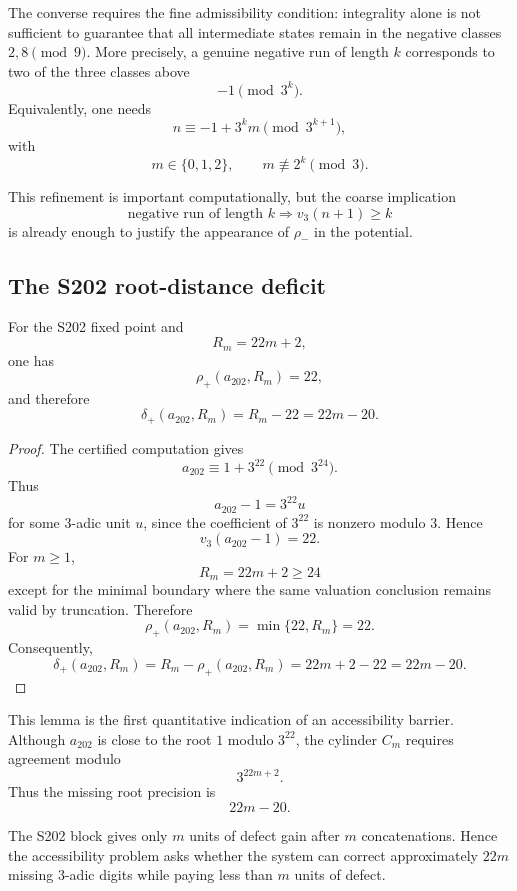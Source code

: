 The converse requires the fine admissibility condition: integrality alone
is not sufficient to guarantee that all intermediate states remain in the
negative classes \(2,8\pmod9\). More precisely, a genuine negative run of
length \(k\) corresponds to two of the three classes above
\[
-1\pmod{3^k}.
\]
Equivalently, one needs
\[
n\equiv -1+3^k m\pmod{3^{k+1}},
\]
with
\[
m\in\{0,1,2\},
\qquad
m\not\equiv 2^k\pmod3.
\]

This refinement is important computationally, but the coarse implication
\[
\text{negative run of length }k
\Longrightarrow
v_3(n+1)\ge k
\]
is already enough to justify the appearance of \(\rho_-\) in the potential.

\subsection{The S202 root-distance deficit}
\label{subsec:S202-root-distance-deficit}

\begin{lemma}
\label{lem:S202-root-deficit}
For the S202 fixed point and
\[
R_m=22m+2,
\]
one has
\[
\rho_+(a_{202},R_m)=22,
\]
and therefore
\[
\delta_+(a_{202},R_m)
=
R_m-22
=
22m-20.
\]
\end{lemma}

\begin{proof}
The certified computation gives
\[
a_{202}\equiv1+3^{22}\pmod{3^{24}}.
\]
Thus
\[
a_{202}-1
=
3^{22}u
\]
for some \(3\)-adic unit \(u\), since the coefficient of \(3^{22}\) is
nonzero modulo \(3\). Hence
\[
v_3(a_{202}-1)=22.
\]
For \(m\ge1\),
\[
R_m=22m+2\ge24
\]
except for the minimal boundary where the same valuation conclusion remains
valid by truncation. Therefore
\[
\rho_+(a_{202},R_m)
=
\min\{22,R_m\}
=
22.
\]
Consequently,
\[
\delta_+(a_{202},R_m)
=
R_m-\rho_+(a_{202},R_m)
=
22m+2-22
=
22m-20.
\]
\end{proof}

This lemma is the first quantitative indication of an accessibility
barrier. Although \(a_{202}\) is close to the root \(1\) modulo \(3^{22}\),
the cylinder \(C_m\) requires agreement modulo
\[
3^{22m+2}.
\]
Thus the missing root precision is
\[
22m-20.
\]

The S202 block gives only \(m\) units of defect gain after \(m\)
concatenations. Hence the accessibility problem asks whether the system can
correct approximately \(22m\) missing \(3\)-adic digits while paying less
than \(m\) units of defect.


